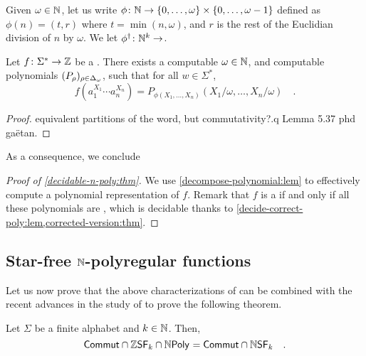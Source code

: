 \AP Given $\omega \in \mathbb{N}$, let us write $\phi \colon \mathbb{N} \to \mathopen{\{} 0, \dots,
\omega \mathclose{\}} \times \mathopen{\{} 0, \dots, \omega - 1 \mathclose{\}}$ defined as $\phi(n) = (t, r)$ where
$t = \min(n, \omega)$, and $r$ is the rest of the Euclidian division of $n$ by
$\omega$.
We let $\phi^\dagger \colon \mathbb{N}^k \to$.


\begin{lemma}
    \label{decompose-polynomial:lem}
    Let $f \colon \Sigma^* \to \mathbb{Z}$ be a 
    . There exists a computable
    $\omega \in \mathbb{N}$,
    and computable 
    polynomials $(P_{\rho})_{\rho \in \Delta_\omega}$,
    such that for all $w \in \Sigma^*$,
    \begin{equation*}
        f\left(a_1^{X_1} \cdots a_n ^{X_n}\right) = P_{\phi(X_1, \dots, X_n)} (X_1 / \omega, \dots, X_n / \omega)
        \quad .
    \end{equation*}
\end{lemma}
\begin{proof}
    equivalent partitions of the word, but commutativity?.q
    Lemma 5.37 phd gaëtan.
\end{proof}

As a consequence, we conclude 
\begin{proof}[Proof of \cref{decidable-n-poly:thm}]
    We use \cref{decompose-polynomial:lem}
    to effectively compute
    a polynomial representation of $f$. Remark that
    $f$ is a  if and only if
    all these polynomials are ,
    which is decidable thanks to
    \cref{decide-correct-poly:lem,corrected-version:thm}.
\end{proof}



\subsection{Star-free $\mathbb{N}$-polyregular functions}
\label{star-free:sec}


Let us now prove that the above characterizations of 
 can be combined with the recent advances in
the study of  \cite{LOPEZ23b} to prove the
following theorem.

\begin{theorem}
    \label{zsf-npoly-nsf:thm}
    Let $\Sigma$ be a finite alphabet and $k \in \mathbb{N}$.
    Then,
    \begin{equation*}
        \ZCommut \cap \ZSF[k] \cap \NPoly
        = \ZCommut \cap \NSF[k]
        \quad .
    \end{equation*}
\end{theorem}

